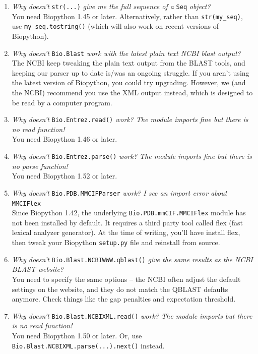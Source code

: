 \documentclass{report}
\begin{document}
\begin{enumerate}
  \item \emph{Why doesn't} \verb|str(...)| \emph{give me the full sequence of a} \verb|Seq| \emph{object?} \\
  You need Biopython 1.45 or later.  Alternatively, rather than \verb|str(my_seq)|, use \verb|my_seq.tostring()| (which will also work on recent versions of Biopython).
  
  \item \emph{Why doesn't} \verb|Bio.Blast| \emph{work with the latest plain text NCBI blast output?} \\
  The NCBI keep tweaking the plain text output from the BLAST tools, and keeping our parser up to date is/was an ongoing struggle.
  If you aren't using the latest version of Biopython, you could try upgrading.
  However, we (and the NCBI) recommend you use the XML output instead, which is designed to be read by a computer program.

  \item \emph{Why doesn't} \verb|Bio.Entrez.read()| \emph{work? The module imports fine but there is no read function!} \\
  You need Biopython 1.46 or later.

  \item \emph{Why doesn't} \verb|Bio.Entrez.parse()| \emph{work? The module imports fine but there is no parse function!} \\
  You need Biopython 1.52 or later.

  \item \emph{Why doesn't} \verb|Bio.PDB.MMCIFParser| \emph{work? I see an import error about} \verb|MMCIFlex| \\
  Since Biopython 1.42, the underlying \verb|Bio.PDB.mmCIF.MMCIFlex| module has
  not been installed by default.  It requires a third party tool called flex
  (fast lexical analyzer generator). At the time of writing, you'll have install
  flex, then tweak your Biopython \verb|setup.py| file and reinstall from source.

  \item \emph{Why doesn't} \verb|Bio.Blast.NCBIWWW.qblast()| \emph{give the same results as the NCBI BLAST website?} \\
  You need to specify the same options -- the NCBI often adjust the default settings on the website,
  and they do not match the QBLAST defaults anymore. Check things like the gap penalties and expectation threshold.

  \item \emph{Why doesn't} \verb|Bio.Blast.NCBIXML.read()| \emph{work? The module imports but there is no read function!} \\
  You need Biopython 1.50 or later.  Or, use \texttt{Bio.Blast.NCBIXML.parse(...).next()} instead.
  

\end{enumerate}
\end{document}
